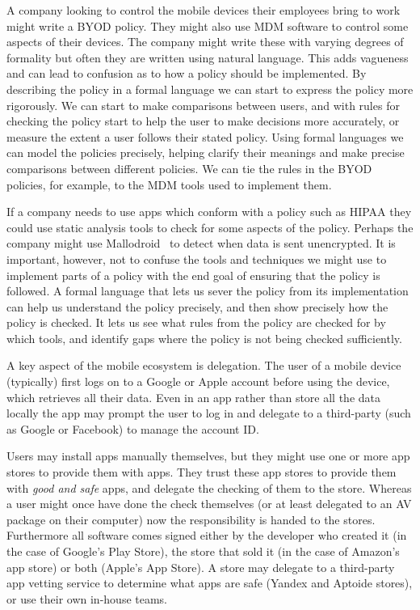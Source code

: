 \documentclass[thesis.tex]{subfiles}
\begin{document}
A company looking to control the mobile devices their employees bring
to work might write a \ac{BYOD} policy.  They might also use \ac{MDM}
software to control some aspects of their devices.  The company might
write these with varying degrees of formality but often they are
written using natural language.  This adds vagueness and can lead to
confusion as to how a policy should be implemented.  By describing the
policy in a formal language we can start to express the policy more
rigorously.  We can start to make comparisons between users, and with
rules for checking the policy start to help the user to make decisions
more accurately, or measure the extent a user follows their stated
policy.  Using formal languages we can
model the policies precisely, helping clarify their meanings and make
precise comparisons between different policies.  We can tie the rules
in the \ac{BYOD} policies, for example, to the \ac{MDM} tools used to
implement them.

If a company needs to use apps which conform with a policy such as
\ac{HIPAA} they could use static analysis tools to check for some
aspects of the policy.  Perhaps the company might use
Mallodroid~\cite{fahl_why_2012} to detect when data is sent
unencrypted.  It is important, however, not to confuse the tools and
techniques we might use to implement parts of a policy with the end
goal of ensuring that the policy is followed.  A formal language that
lets us sever the policy from its implementation can help us
understand the policy precisely, and then show precisely how the
policy is checked.  It lets us see what rules from the policy are
checked for by which tools, and identify gaps where the policy is not
being checked sufficiently.

A key aspect of the mobile ecosystem is delegation.  The user of a
mobile device (typically) first logs on to a Google or Apple account
before using the device, which retrieves all their data.  Even in an
app rather than store all the data locally the app may prompt the user
to log in and delegate to a third-party (such as Google or Facebook)
to manage the account ID.

Users may install apps manually themselves, but they might use one or
more app stores to provide them with apps.  They trust these app
stores to provide them with \emph{good and safe} apps, and delegate
the checking of them to the store.  Whereas a user might once have
done the check themselves (or at least delegated to an \ac{AV} package
on their computer) now the responsibility is handed to the stores.
Furthermore all software comes signed either by the developer who
created it (in the case of Google's Play Store), the store that sold
it (in the case of Amazon's app store) or both (Apple's App Store).  A
store may delegate to a third-party app vetting service to determine
what apps are safe (Yandex and Aptoide stores), or use their own
in-house teams.
\end{document}
